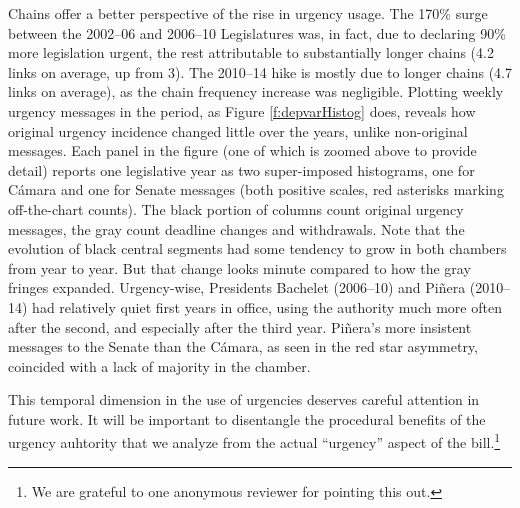 \documentclass[letter,12pt]{article}
\begin{document}

Chains offer a better perspective of the rise in urgency usage. The 170\% surge between the 2002--06 and 2006--10 Legislatures was, in fact, due to declaring 90\% more legislation urgent, the rest attributable to substantially longer chains (4.2 links on average, up from 3). The 2010--14 hike is mostly due to longer chains (4.7 links on average), as the chain frequency increase was negligible. Plotting weekly urgency messages in the period, as Figure \ref{f:depvarHistog} does, reveals how original urgency incidence changed little over the years, unlike non-original messages. Each panel in the figure (one of which is zoomed above to provide detail) reports one legislative year as two super-imposed histograms, one for C\'amara and one for Senate messages (both positive scales, red asterisks marking off-the-chart counts). The black portion of columns count original urgency messages, the gray count deadline changes and withdrawals. Note that the evolution of black central segments had some tendency to grow in both chambers from year to year. But that change looks minute compared to how the gray fringes expanded. Urgency-wise, Presidents Bachelet (2006--10) and Pi\~nera (2010--14) had relatively quiet first years in office, using the authority much more often after the second, and especially after the third year. Pi\~nera's more insistent messages to the Senate than the C\'amara, as seen in the red star asymmetry, coincided with a lack of majority in the chamber. 

This temporal dimension in the use of urgencies deserves careful attention in future work. It will be important to disentangle the procedural benefits of the urgency auhtority that we analyze from the actual ``urgency'' aspect of the bill.\footnote{We are grateful to one anonymous reviewer for pointing this out.}
\end{document}
